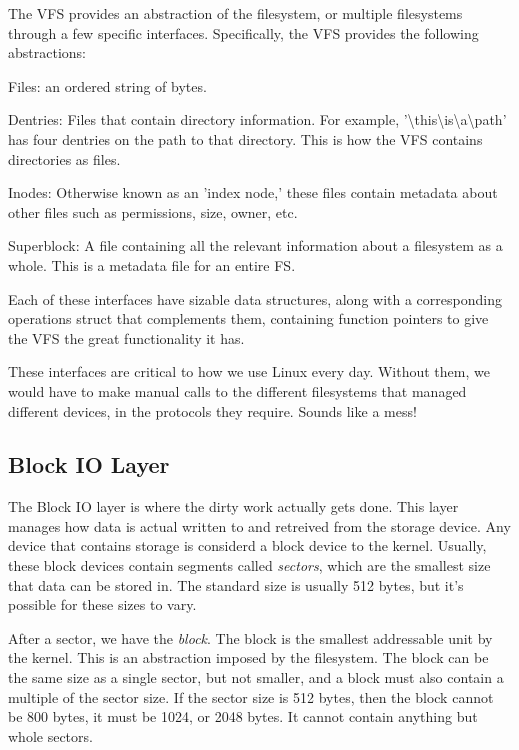   The VFS provides an abstraction of the filesystem, or multiple filesystems
  through a few specific interfaces. Specifically, the VFS provides the
  following abstractions:
  \begin{description}
    \item Files: an ordered string of bytes.
    \item Dentries: Files that contain directory information. For example,
    '\textbackslash this\textbackslash is\textbackslash a\textbackslash path'
    has four dentries on the path to that directory. This is how the VFS contains
    directories as files.
    \item Inodes: Otherwise known as an 'index node,' these files contain metadata
    about other files such as permissions, size, owner, etc.
    \item Superblock: A file containing all the relevant information about a filesystem
    as a whole. This is a metadata file for an entire FS.
  \end{description}

  Each of these interfaces have sizable data structures, along with a corresponding
  operations struct that complements them, containing function pointers to give the
  VFS the great functionality it has.\cite{robertlove2010}

  These interfaces are critical to how we use Linux every day. Without them, we
  would have to make manual calls to the different filesystems that managed different
  devices, in the protocols they require. Sounds like a mess!

  \subsection{Block IO Layer}
  The Block IO layer is where the dirty work actually gets done. This layer
  manages how data is actual written to and retreived from the storage device.
  Any device that contains storage is considerd a block device to the kernel.
  Usually, these block devices contain segments called \textit{sectors}, which
  are the smallest size that data can be stored in. The standard size is usually
  512 bytes, but it's possible for these sizes to vary.

  After a sector, we have the \textit{block}. The block is the smallest addressable
  unit by the kernel. This is an abstraction imposed by the filesystem. The block
  can be the same size as a single sector, but not smaller, and a block must also
  contain a multiple of the sector size. If the sector size is 512 bytes, then the
  block cannot be 800 bytes, it must be 1024, or 2048 bytes. It cannot contain
  anything but whole sectors.

